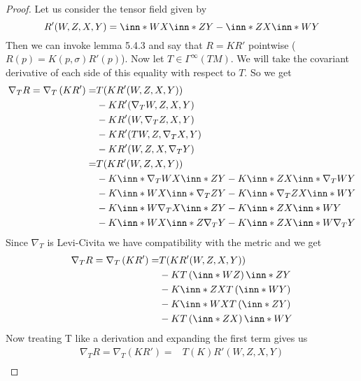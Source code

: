 \documentclass[a4paper]{article}
\begin{document}
\begin{proof}
  Let us consider the tensor field given by
  \[
    R'(W,Z,X,Y) = \inn*{W}{X}\inn*{Z}{Y} - \inn*{Z}{X}\inn*{W}{Y}
  \]
  Then we can invoke lemma 5.4.3 and say that $R = KR'$ pointwise ($R(p) = K(p,\sigma)R'(p)$).  Now let $T \in \Gamma^\infty(TM)$. We will take the covariant derivative of each side of this equality with respect to $T$. So we get
  \[
    \begin{aligned}
      \nabla_T R = \nabla_T \left(KR'\right) =&  T(KR'(W,Z,X,Y)) \\
                                             &- KR'(\nabla_T W, Z,X,Y) \\
                                             &- KR'(W, \nabla_T Z,X,Y) \\
                                             &- KR'(T W, Z,\nabla_T X,Y) \\
                                             &- KR'(W, Z,X,\nabla_T Y) \\
      =& T(KR'(W,Z,X,Y)) \\
       &- K\inn*{\nabla_T W}{X}\inn*{Z}{Y} - K\inn*{Z}{X}\inn*{\nabla_T W}{Y} \\
       &- K\inn*{W}{X}\inn*{\nabla_T Z}{Y} - K\inn*{\nabla_T Z}{X}\inn*{W}{Y} \\
       &- K\inn*{W}{\nabla_T X}\inn*{Z}{Y} - K\inn*{Z}{X}\inn*{W}{Y} \\
       &- K\inn*{W}{X}\inn*{Z}{\nabla_T Y} - K\inn*{Z}{X}\inn*{W}{\nabla_T Y}
    \end{aligned}
  \]
  Since $\nabla_T$ is Levi-Civita we have compatibility with the metric and we get
  \[
    \begin{aligned}
      \nabla_T R = \nabla_T \left(KR'\right) =&  T(KR'(W,Z,X,Y)) \\
                                              &- KT \left( \inn*{W}{Z} \right)\inn*{Z}{Y} \\
                                              &- K\inn*{Z}{X} T \left( \inn*{W}{Y} \right) \\
                                              &- K\inn*{W}{X} T \left( \inn*{Z}{Y} \right) \\
                                              &- KT \left( \inn*{Z}{X} \right) \inn*{W}{Y}
    \end{aligned}
  \]
  Now treating T like a derivation and expanding the first term gives us
  \[
    \begin{aligned}
      \nabla_T R = \nabla_T \left(KR'\right) =&  T(K)R'(W,Z,X,Y) \\

\end{aligned}\]
\end{proof}
\end{document}
